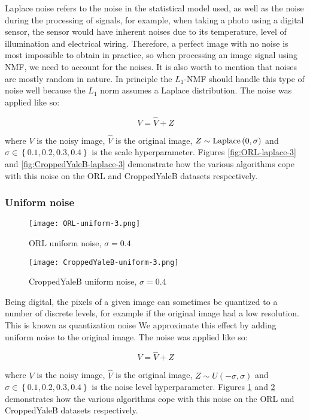 \documentclass{article} %
\begin{document}
Laplace noise refers to the noise in the statistical model used, as well as the noise during the processing of signals, for example, when taking a photo using a digital sensor, the sensor would have inherent noises due to its temperature, level of illumination and electrical wiring. Therefore, a perfect image with no noise is most impossible to obtain in practice, so when processing an image signal using NMF, we need to account for the noises. It is also worth to mention that noises are mostly random in nature. In principle the $L_1$-NMF should handle this type of noise well because the $L_1$ norm assumes a Laplace distribution. The noise was applied like so:

\begin{equation}
V = \hat{V} + Z
\end{equation}

where $V$ is the noisy image, $\hat{V}$ is the original image, $Z \sim \textup{Laplace}\left(0,\sigma\right)$ and $\sigma \in \left\{0.1,0.2,0.3,0.4\right\}$ is the scale hyperparameter. Figures \ref{fig:ORL-laplace-3} and \ref{fig:CroppedYaleB-laplace-3} demonstrate how the various algorithms cope with this noise on the ORL and CroppedYaleB datasets respectively.

\subsubsection{Uniform noise}
\begin{figure}
\texttt{[image: ORL-uniform-3.png]}
\caption{ORL uniform noise, $\sigma=0.4$ \label{fig:ORL-uniform-3}}
\end{figure}
\begin{figure}
\texttt{[image: CroppedYaleB-uniform-3.png]}
\caption{CroppedYaleB uniform noise, $\sigma=0.4$ \label{fig:CroppedYaleB-uniform-3}}
\end{figure}

Being digital, the pixels of a given image can sometimes be quantized to a number of discrete levels, for example if the original image had a low resolution. This is known as quantization noise \cite{uniform} We approximate this effect by adding uniform noise to the original image. The noise was applied like so:

\begin{equation}
V = \hat{V} + Z
\end{equation}

where $V$ is the noisy image, $\hat{V}$ is the original image, $Z \sim U\left(-\sigma,\sigma\right)$ and $\sigma \in \left\{0.1,0.2,0.3,0.4\right\}$ is the noise level hyperparameter. Figures \ref{fig:ORL-uniform-3} and \ref{fig:CroppedYaleB-uniform-3} demonstrates how the various algorithms cope with this noise on the ORL and CroppedYaleB datasets respectively.
\end{document}
